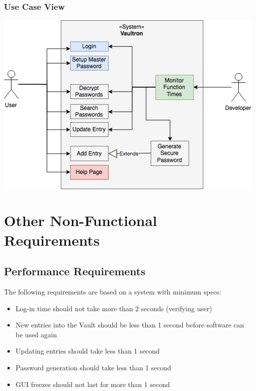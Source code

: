 \documentclass[11pt]{report}
\newenvironment{myitemize}
{ \begin{itemize}
    \setlength{\itemsep}{0pt}
    \setlength{\parskip}{0pt}
    \setlength{\parsep}{0pt}     }
{ \end{itemize}                  }
\begin{document}
\subsection{Use Case View}
\begin{center}
\includegraphics[scale=0.72]{use-case.png}
\end{center}




\chapter{Other Non-Functional Requirements}

\section{Performance Requirements}
The following requirements are based on a system with minimum specs:
\begin{myitemize}
    \item Log-in time should not take more than 2 seconds (verifying user)
    \item New entries into the Vault should be less than 1 second before software can be used again
    \item Updating entries should take less than 1 second
    \item Password generation should take less than 1 second
    \item GUI freezes should not last for more than 1 second
\end{myitemize}
\end{document}

